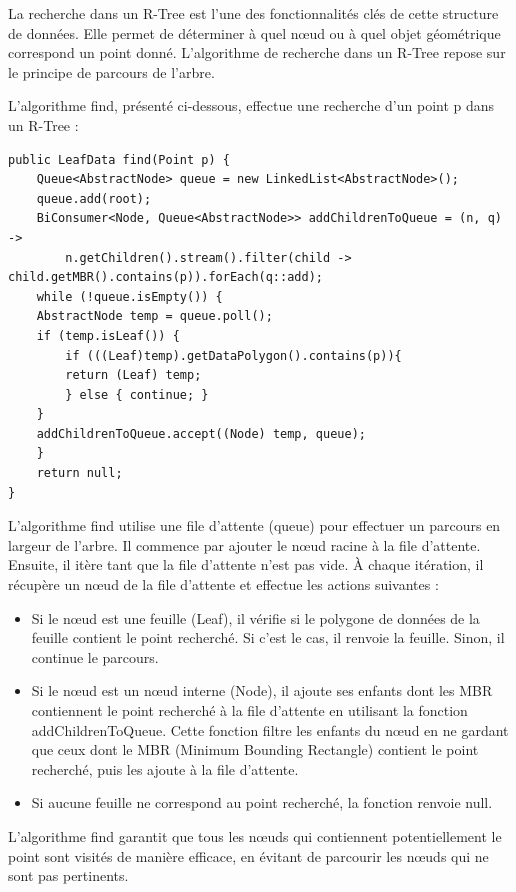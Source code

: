 \documentclass {article}
\begin{document}
La recherche dans un R-Tree est l'une des fonctionnalités clés de cette structure de données.
Elle permet de déterminer à quel nœud ou à quel objet géométrique correspond un point donné.
L'algorithme de recherche dans un R-Tree repose sur le principe de parcours de l'arbre.

L'algorithme find, présenté ci-dessous, effectue une recherche d'un point p dans un R-Tree :


\begin{verbatim}
public LeafData find(Point p) {
    Queue<AbstractNode> queue = new LinkedList<AbstractNode>();
    queue.add(root);
    BiConsumer<Node, Queue<AbstractNode>> addChildrenToQueue = (n, q) ->
        n.getChildren().stream().filter(child -> child.getMBR().contains(p)).forEach(q::add);
    while (!queue.isEmpty()) {
	AbstractNode temp = queue.poll();
	if (temp.isLeaf()) {
	    if (((Leaf)temp).getDataPolygon().contains(p)){
		return (Leaf) temp;
	    } else { continue; }
	}
	addChildrenToQueue.accept((Node) temp, queue);
    }
    return null;
}
\end{verbatim}

L'algorithme find utilise une file d'attente (queue) pour effectuer un parcours en largeur de l'arbre.
Il commence par ajouter le nœud racine à la file d'attente. Ensuite, il itère tant que la file d'attente
n'est pas vide. À chaque itération, il récupère un nœud de la file d'attente et effectue les actions suivantes :

\begin{itemize}
    \item Si le nœud est une feuille (Leaf), il vérifie si le polygone de données de la feuille contient le point
	recherché. Si c'est le cas, il renvoie la feuille.
	Sinon, il continue le parcours.
    \item Si le nœud est un nœud interne (Node), il ajoute ses enfants dont les MBR contiennent le point
	recherché à la file d'attente en utilisant la fonction addChildrenToQueue.
	Cette fonction filtre les enfants du nœud en ne gardant que ceux dont le MBR (Minimum Bounding Rectangle)
	contient le point recherché, puis les ajoute à la file d'attente.
    \item Si aucune feuille ne correspond au point recherché, la fonction renvoie null.
\end{itemize}

L'algorithme find garantit que tous les nœuds qui contiennent potentiellement le point sont visités de manière
efficace, en évitant de parcourir les nœuds qui ne sont pas pertinents.
\end{document}
